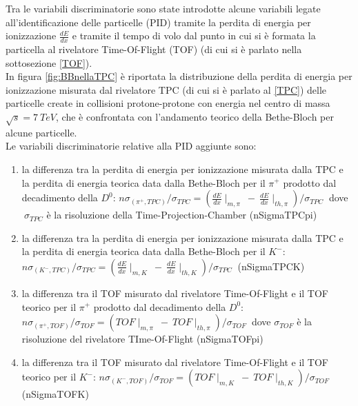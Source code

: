     Tra le variabili discriminatorie sono state introdotte alcune variabili legate all'identificazione delle particelle (PID) tramite la perdita di energia per ionizzazione $\frac{dE}{dx}$ e tramite il tempo di volo dal punto in cui si è formata la particella al rivelatore Time-Of-Flight (TOF) (di cui si è parlato nella sottosezione \ref{TOF}).
    \\In figura \ref{fig:BBnellaTPC} è riportata la distribuzione della perdita di energia per ionizzazione misurata dal rivelatore TPC (di cui si è parlato al \ref{TPC}) delle particelle create in collisioni protone-protone con energia nel centro di massa $\sqrt{s} = 7 \ TeV$, che è confrontata con l'andamento teorico della Bethe-Bloch per alcune particelle.
    \\ Le variabili discriminatorie relative alla PID aggiunte sono:
        \begin{enumerate}[resume]
            \item la differenza tra la perdita di energia per ionizzazione misurata dalla TPC e la perdita di energia teorica data dalla Bethe-Bloch per il $\pi^+$ prodotto dal decadimento della $D^0$: $n\sigma_{(\pi^+,TPC)}/\sigma_{TPC} = (\frac{dE}{dx}\mid_{m, \pi} \ - \ \frac{dE}{dx}\mid_{th, \pi} ) / \sigma_{TPC} \ $ dove $ \ \sigma_{TPC}$ è la risoluzione della Time-Projection-Chamber (nSigmaTPCpi)
            \item la differenza tra la perdita di energia per ionizzazione misurata dalla TPC e la perdita di energia teorica data dalla Bethe-Bloch per il $K^-$: $n\sigma_{(K^-,TPC)}/\sigma_{TPC} = (\frac{dE}{dx}\mid_{m,K} \ - \ \frac{dE}{dx}\mid_{th,K} ) / \sigma_{TPC} \ $ (nSigmaTPCK)
            \item la differenza tra il TOF misurato dal rivelatore Time-Of-Flight e il TOF teorico per il  $\pi^+$ prodotto dal decadimento della $D^0$: $ n\sigma_{(\pi^+,TOF)}/\sigma_{TOF} = (TOF\mid_{m,\pi} \ - \ TOF\mid_{th,\pi}) / \sigma_{TOF} \ $ dove $\sigma_{TOF}$ è la risoluzione del rivelatore TIme-Of-Flight (nSigmaTOFpi)
            \item la differenza tra il TOF misurato dal rivelatore Time-Of-Flight e il TOF teorico per il  $K^-$: $n\sigma_{(K^-,TOF)}/\sigma_{TOF} = (TOF\mid_{m,K} \ - \ TOF\mid_{th,K}) / \sigma_{TOF} \ $ (nSigmaTOFK)
        \end{enumerate}
    
        
